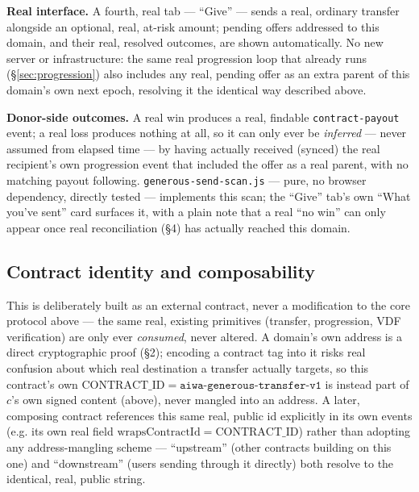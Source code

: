 \documentclass[10pt]{article}
\newcommand{\code}[1]{\texttt{\small #1}}
\begin{document}
\textbf{Real interface.} A fourth, real tab --- ``Give'' --- sends a real, ordinary transfer alongside an optional, real, at-risk amount; pending offers addressed to this domain, and their real, resolved outcomes, are shown automatically. No new server or infrastructure: the same real progression loop that already runs (\S\ref{sec:progression}) also includes any real, pending offer as an extra parent of this domain's own next epoch, resolving it the identical way described above.

\textbf{Donor-side outcomes.} A real win produces a real, findable \code{contract-payout} event; a real loss produces nothing at all, so it can only ever be \emph{inferred} --- never assumed from elapsed time --- by having actually received (synced) the real recipient's own progression event that included the offer as a real parent, with no matching payout following. \code{generous-send-scan.js} --- pure, no browser dependency, directly tested --- implements this scan; the ``Give'' tab's own ``What you've sent'' card surfaces it, with a plain note that a real ``no win'' can only appear once real reconciliation (\S4) has actually reached this domain.

\subsection{Contract identity and composability}

This is deliberately built as an external contract, never a modification to the core protocol above --- the same real, existing primitives (transfer, progression, VDF verification) are only ever \emph{consumed}, never altered. A domain's own address is a direct cryptographic proof (\S2); encoding a contract tag into it risks real confusion about which real destination a transfer actually targets, so this contract's own $\mathrm{CONTRACT\_ID} = \texttt{aiwa-generous-transfer-v1}$ is instead part of $c$'s own signed content (above), never mangled into an address. A later, composing contract references this same real, public id explicitly in its own events (e.g. its own real field $\mathrm{wrapsContractId} = \mathrm{CONTRACT\_ID}$) rather than adopting any address-mangling scheme --- ``upstream'' (other contracts building on this one) and ``downstream'' (users sending through it directly) both resolve to the identical, real, public string.
\end{document}
